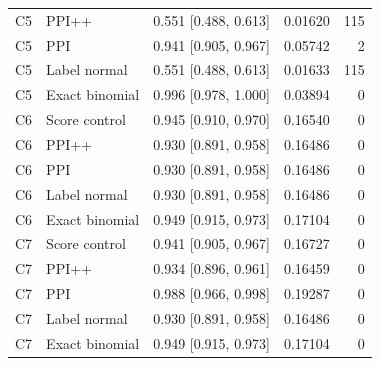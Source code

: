 \documentclass{article}
\begin{document}
\begin{longtable}{llrrr}
C5 & PPI++ & 0.551 [0.488, 0.613] & 0.01620 & 115 \\
C5 & PPI & 0.941 [0.905, 0.967] & 0.05742 & 2 \\
C5 & Label normal & 0.551 [0.488, 0.613] & 0.01633 & 115 \\
C5 & Exact binomial & 0.996 [0.978, 1.000] & 0.03894 & 0 \\
\midrule
C6 & Score control & 0.945 [0.910, 0.970] & 0.16540 & 0 \\
C6 & PPI++ & 0.930 [0.891, 0.958] & 0.16486 & 0 \\
C6 & PPI & 0.930 [0.891, 0.958] & 0.16486 & 0 \\
C6 & Label normal & 0.930 [0.891, 0.958] & 0.16486 & 0 \\
C6 & Exact binomial & 0.949 [0.915, 0.973] & 0.17104 & 0 \\
\midrule
C7 & Score control & 0.941 [0.905, 0.967] & 0.16727 & 0 \\
C7 & PPI++ & 0.934 [0.896, 0.961] & 0.16459 & 0 \\
C7 & PPI & 0.988 [0.966, 0.998] & 0.19287 & 0 \\
C7 & Label normal & 0.930 [0.891, 0.958] & 0.16486 & 0 \\
C7 & Exact binomial & 0.949 [0.915, 0.973] & 0.17104 & 0 \\
\midrule
\bottomrule
\end{longtable}
\end{document}
